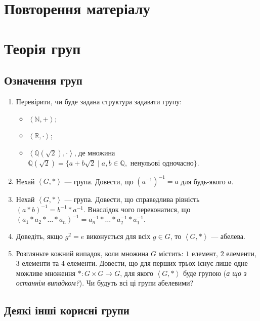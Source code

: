 \documentclass{math_library}
\begin{document}


\section*{Повторення матеріалу}
\newpage

\section{Теорія груп}

\subsection{Означення груп}
\begin{enumerate}[wide=0pt,label=\thesubsection.\arabic*]
\item Перевірити, чи буде задана структура задавати групу:
\begin{itemize}[nosep,wide=0pt]
\item $\left< \mathbb{N}, + \right>$;
\item $\left< \mathbb{R}, \cdot \right>$;
\item $\left< \mathbb{Q}(\sqrt{2}), \cdot \right>$, де множина $\mathbb{Q}(\sqrt{2}) = \{ a+b \sqrt{2} \mid a, b \in \mathbb{Q}, \text{ ненульові одночасно} \}$.
\end{itemize}

\item Нехай $\left<G,*\right>$ --- група. Довести, що $(a^{-1})^{-1} = a$ для будь-якого $a$.

\item Нехай $\left<G,*\right>$ --- група. Довести, що справедлива рівність $(a*b)^{-1} = b^{-1}*a^{-1}$. Внаслідок чого переконатися, що $(a_1*a_2*\dots*a_n)^{-1} = a_n^{-1}* \dots *a_2^{-1}*a_1^{-1}$.

\item Доведіть, якщо $g^2 = e$ виконується для всіх $g \in G$, то $\left<G,*\right>$ --- абелева.

\item Розгляньте кожний випадок, коли множина $G$ містить: $1$ елемент, $2$ елементи, $3$ елементи та $4$ елементи. Довести, що для перших трьох існує лише одне можливе множення $* \colon G \times G \to G$, для якого $\left<G,*\right>$ буде групою (\textit{а що з останнім випадком?}). Чи будуть всі ці групи абелевими? 
\end{enumerate}

\subsection{Деякі інші корисні групи}
\end{document}
